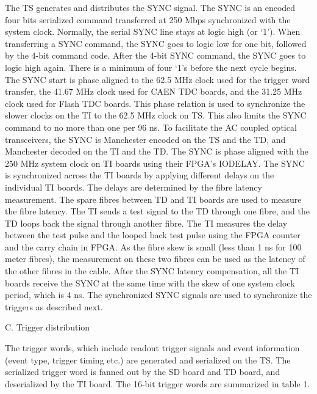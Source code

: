The TS generates and distributes the SYNC signal.  The SYNC is an encoded four bits serialized command transferred at 250 Mbps synchronized with the system clock.  Normally, the serial SYNC line stays at logic high (or ‘1’).  When transferring a SYNC command, the SYNC goes to logic low for one bit, followed by the 4-bit command code.  After the 4-bit SYNC command, the SYNC goes to logic high again.  There is a minimum of four ‘1’s before the next cycle begins.  The SYNC start is phase aligned to the 62.5 MHz clock used for the trigger word transfer, the 41.67 MHz clock used for CAEN TDC boards, and the 31.25 MHz clock used for Flash TDC boards.  This phase relation is used to synchronize the slower clocks on the TI to the 62.5 MHz clock on TS.  This also limits the SYNC command to no more than one per 96 ns.  To facilitate the AC coupled optical transceivers, the SYNC is Manchester encoded on the TS and the TD, and Manchester decoded on the TI and the TD.
The SYNC is phase aligned with the 250 MHz system clock on TI boards using their FPGA’s IODELAY.  The SYNC is synchronized across the TI boards by applying different delays on the individual TI boards.  The delays are determined by the fibre latency measurement.  
The spare fibres between TD and TI boards are used to measure the fibre latency.  The TI sends a test signal to the TD through one fibre, and the TD loops back the signal through another fibre.  The TI measures the delay between the test pulse and the looped back test pulse using the FPGA counter and the carry chain in FPGA.  As the fibre skew is small (less than 1 ns for 100 meter fibres), the measurement on these two fibres can be used as the latency of the other fibres in the cable.  
After the SYNC latency compensation, all the TI boards receive the SYNC at the same time with the skew of one system clock period, which is 4 ns.  The synchronized SYNC signals are used to synchronize the triggers as described next.

C.	Trigger distribution

The trigger words, which include readout trigger signals and event information (event type, trigger timing etc.) are generated and serialized on the TS.  The serialized trigger word is fanned out by the SD board and TD board, and deserialized by the TI board.  The 16-bit trigger words are summarized in table 1.  



